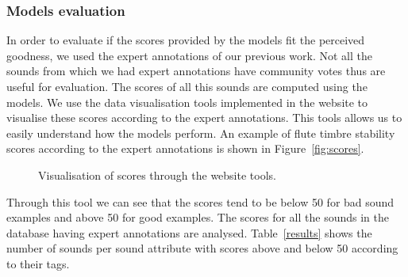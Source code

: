 \documentclass{article}
\begin{document}
\subsubsection{Models evaluation}
In order to evaluate if the scores provided by the models fit the perceived goodness, we used the expert annotations of our previous work. Not all the sounds from which we had expert annotations have community votes thus are useful for evaluation. The scores of all this sounds are computed using the models. We use the data visualisation tools implemented in the website to visualise these scores according to the expert annotations. This tools allows us to easily understand how the models perform. An example of flute timbre stability scores according to the expert annotations is shown in Figure~\ref{fig:scores}.

\begin{figure}
 \centerline{}
 \caption{Visualisation of scores through the website tools.}
 \label{fig:scores_3}
\end{figure}

Through this tool we can see that the scores tend to be below 50 for bad sound examples and above 50 for good examples. The scores for all the sounds in the database having expert annotations are analysed. Table~\ref{results} shows the number of sounds per sound attribute with scores above and below 50 according to their tags.
\end{document}
